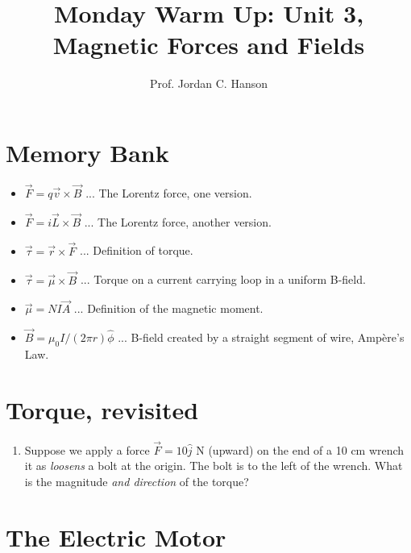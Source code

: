 \documentclass{article}
\begin{document}
\twocolumn

\title{Monday Warm Up: Unit 3, Magnetic Forces and Fields}
\author{Prof. Jordan C. Hanson}

\maketitle

\section{Memory Bank}

\begin{itemize}
\item $\vec{F} = q\vec{v} \times \vec{B}$ ... The Lorentz force, one version.
\item $\vec{F} = i\vec{L} \times \vec{B}$ ... The Lorentz force, another version.
\item $\vec{\tau} = \vec{r} \times \vec{F}$ ... Definition of torque.
\item $\vec{\tau} = \vec{\mu} \times \vec{B}$ ... Torque on a current carrying loop in a uniform B-field.
\item $\vec{\mu} = NI\vec{A}$ ... Definition of the magnetic moment.
\item $\vec{B} = \mu_0 I/(2\pi r)\hat{\phi}$ ... B-field created by a straight segment of wire, Amp\`{e}re's Law.
\end{itemize}

\section{Torque, revisited}

\begin{enumerate}
\item Suppose we apply a force $\vec{F} = 10\hat{j}$ N (upward) on the end of a 10 cm wrench it as \textit{loosens} a bolt at the origin.  The bolt is to the left of the wrench.  What is the magnitude \textit{and direction} of the torque? \\ \vspace{1cm}
\end{enumerate}

\section{The Electric Motor}
\end{document}
